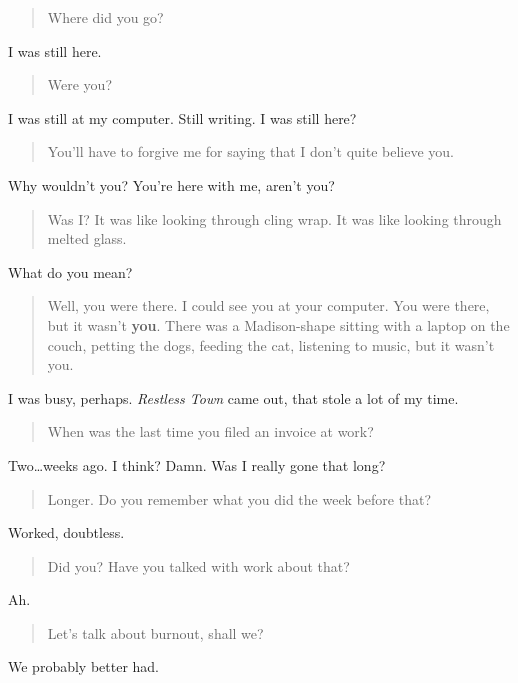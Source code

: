 \begin{paracol}{2}
  \begin{leftcolumn}

\begin{quote}
Where did you go?
\end{quote}
I was still here.

\begin{quote}
Were you?
\end{quote}
I was still at my computer. Still writing. I was still here?

\begin{quote}
You'll have to forgive me for saying that I don't quite believe you.
\end{quote}
Why wouldn't you? You're here with me, aren't you?

\begin{quote}
Was I? It was like looking through cling wrap. It was like looking through melted glass.
\end{quote}
What do you mean?

\begin{quote}
Well, you were there. I could see you at your computer. You were there, but it wasn't \textbf{you}. There was a Madison-shape sitting with a laptop on the couch, petting the dogs, feeding the cat, listening to music, but it wasn't you.
\end{quote}
I was busy, perhaps. \emph{Restless Town} came out, that stole a lot of my time.

\begin{quote}
When was the last time you filed an invoice at work?
\end{quote}
Two\ldots{}weeks ago. I think? Damn. Was I really gone that long?

\begin{quote}
Longer. Do you remember what you did the week before that?
\end{quote}
Worked, doubtless.

\begin{quote}
Did you? Have you talked with work about that?
\end{quote}
Ah.

\begin{quote}
Let's talk about burnout, shall we?
\end{quote}
We probably better had.
\newpage
\end{leftcolumn}
\end{paracol}
